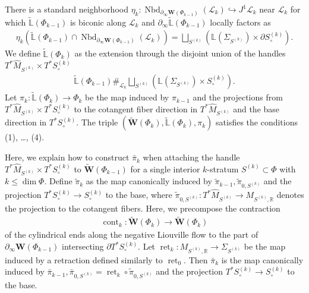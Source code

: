 \documentclass[a4paper,12pt, twoside, pdftex]{amsart}
\theoremstyle{definition}
\numberwithin{equation}{section}
\newcommand{\cont}{\operatorname{cont}}
\newcommand{\del}{\partial}
\newcommand{\Nbd}{\operatorname{Nbd}}
\newcommand{\ret}{\operatorname{ret}}
\newcommand{\cL}{\mathcal{L}}
\newcommand{\bL}{\mathbb{L}}
\newcommand{\bR}{\mathbb{R}}
\newcommand{\bfW}{\mathbf{W}}
\begin{document}
There is a standard neighborhood
$\eta_k
\colon
\Nbd_{\del_\infty \bfW(\Phi_{k-1})}(\cL_k)
\hookrightarrow
J^1 \cL_k$
near
$\cL_k$
for which
$\widetilde{\bL}(\Phi_{k-1})$
is biconic along
$\cL_k$
and
$\del_\infty \widetilde{\bL}(\Phi_{k-1})$
locally factors as
\begin{align*}
\eta_k(\widetilde{\bL}(\Phi_{k-1}) \cap \Nbd_{\del_\infty \bfW(\Phi_{k-1})}(\cL_k))
=
\bigsqcup_{S^{(k)}}
(\bL(\Sigma_{S^{(k)}}) \times \del S^{(k)}_\circ).
\end{align*}
We define
$\widetilde{\bL}(\Phi_k)$
as the extension through the disjoint union of the handles
$T^* \widehat{M}_{S^{(k)}} \times T^* S^{(k)}_\circ$
\begin{align*}
\widetilde{\bL}(\Phi_{k-1}) \#_{\cL_k}  \bigsqcup_{S^{(k)}} (\bL(\Sigma_{S^{(k)}}) \times S^{(k)}_\circ).
\end{align*}
Let
$\pi_k \colon \widetilde{\bL}(\Phi_k) \to \Phi_k$
be the map induced by
$\pi_{k-1}$
and
the projections from
$T^* \widehat{M}_{S^{(k)}} \times T^* S^{(k)}_\circ$
to
the cotangent fiber direction in
$T^* \widehat{M}_{S^{(k)}}$
and
the base direction in
$T^* S^{(k)}_\circ$.
The triple
$(\widetilde{\bfW}(\Phi_k), \widetilde{\bL}(\Phi_k), \pi_k)$
satisfies the conditions
(1), \ldots, (4).

Here,
we explain how to construct
$\bar{\pi}_k$
when attaching the handle
$T^* \widehat{M}_{S^{(k)}} \times T^* S^{(k)}_\circ$
to
$\widetilde{\bfW}(\Phi_{k-1})$
for a single interior $k$-stratum
$S^{(k)} \subset \Phi$
with
$k \leq \dim \Phi$.
Define
$\tilde{\pi}_k$
as the map canonically induced by
$\tilde{\pi}_{k-1}, \tilde{\pi}_{0, S^{(k)}}$
and
the projection
$T^* S^{(k)}_\circ \to S^{(k)}_\circ$
to the base,
where
$\tilde{\pi}_{0, S^{(k)}}
\colon
T^* \widehat{M}_{S^{(k)}} \to M_{S^{(k)}, \bR}$
denotes the projection to the cotangent fibers.
Here,
we precompose the contraction
\begin{align} \label{eq:cont}
\cont_k \colon \widetilde{\bfW}(\Phi_k) \to \widetilde{\bfW}(\Phi_k)
\end{align}
of the cylindrical ends along the negative Liouville flow to the part of
$\del_\infty \bfW(\Phi_{k-1})$
intersecting
$\del T^* S^{(k)}_\circ$.
Let
$\ret_k \colon M_{S^{(k)}, \bR} \to \Sigma_{S^{(k)}}$
be the map induced by a retraction defined similarly to
$\ret_0$.
Then
$\bar{\pi}_k$
is the map canonically induced by
$\bar{\pi}_{k-1},
\bar{\pi}_{0, S^{(k)}} = \ret_k \circ \tilde{\pi}_{0, S^{(k)}}$
and
the projection
$T^* S^{(k)}_\circ \to S^{(k)}_\circ$
to the base.
\end{document}
